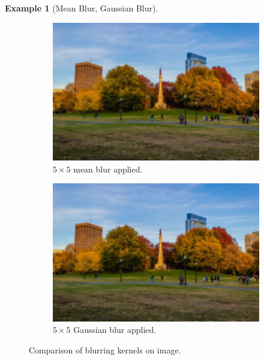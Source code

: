 \documentclass{article}
\theoremstyle{definition}
\newtheorem{example}{Example}[section]
\theoremstyle{remark}
\theoremstyle{definition}
\begin{document}
\begin{example}[Mean Blur, Gaussian Blur]
\begin{figure}[hbt!]
\begin{subfigure}[b]{0.32\textwidth}
    \centering
        \includegraphics[width=\textwidth]{Images/OpenCV/Mean_Blur.png}
        \caption{$5 \times 5$ mean blur applied. }
        \label{fig:d}
    \end{subfigure}
    \begin{subfigure}[b]{0.32\textwidth}
    \centering
        \includegraphics[width=\textwidth]{Images/OpenCV/Gaussian_Blur.png}
        \caption{$5 \times 5$ Gaussian blur applied. }
        \label{fig:d}
    \end{subfigure}

    
    \caption{Comparison of blurring kernels on image. }
    \label{fig:blur}
\end{figure}
\end{example}
\end{document}
